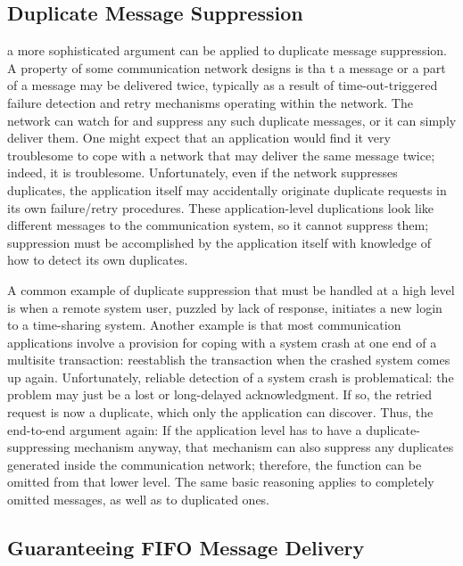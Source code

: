 \documentclass[a4paper,11pt,notitlepage,twoside,openright]{article}
\begin{document}
\hypertarget{duplicate-message-suppression}{%
\subsection{Duplicate Message
Suppression}\label{duplicate-message-suppression}}

a more sophisticated argument can be applied to duplicate message
suppression. A property of some communication network designs is tha t
a message or a part of a message may be delivered twice, typically as
a result of time-out-triggered failure detection and retry mechanisms
operating within the network. The network can watch for and suppress
any such duplicate messages, or it can simply deliver them. One might
expect that an application would find it very troublesome to cope with
a network that may deliver the same message twice; indeed, it is
troublesome. Unfortunately, even if the network suppresses duplicates,
the application itself may accidentally originate duplicate requests
in its own failure/retry procedures. These application-level
duplications look like different messages to the communication
system, so it cannot suppress them; suppression must be accomplished
by the application itself with knowledge of how to detect
its own duplicates.

A common example of duplicate suppression that must be handled at a high
level is when a remote system user, puzzled by lack of response,
initiates a new login to a time-sharing system. Another example is that
most communication applications involve a provision for coping with a
system crash at one end of a multisite transaction: reestablish the
transaction when the crashed system comes up again. Unfortunately,
reliable detection of a system crash is problematical: the problem may
just be a lost or long-delayed acknowledgment. If so, the retried
request is now a duplicate, which only the application can discover.
Thus, the end-to-end argument again: If the application level has to
have a duplicate-suppressing mechanism anyway, that mechanism can also
suppress any duplicates generated inside the communication network; therefore, the
function can be omitted from that lower level. The same basic reasoning
applies to completely omitted messages, as well as to duplicated ones.


\hypertarget{guaranteeing-fifo-message-delivery}{%
\subsection{Guaranteeing FIFO Message
Delivery}\label{guaranteeing-fifo-message-delivery}}
\end{document}
